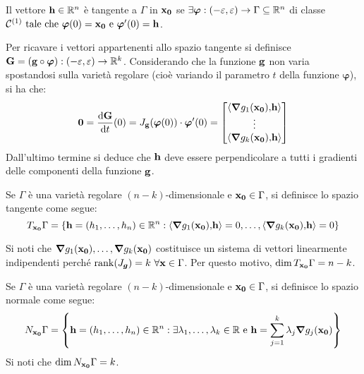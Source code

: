 \begin{definition}
    Il vettore $\vb{h} \in \mathbb{R}^n$ è tangente a $\Gamma$ in $\vb{x_0}$ se $\exists \bm\varphi: (-\varepsilon, \varepsilon) \to \Gamma \subseteq \mathbb{R}^n$ di classe $\mathcal{C}^{(1)} \text{ tale che } \bm\varphi (0) = \vb{x_0} \text{ e } \bm\varphi ' (0) = \vb{h}$.
\end{definition}

Per ricavare i vettori appartenenti allo spazio tangente si definisce $\vb{G}=(\vb{g}\circ\bm\varphi):(-\varepsilon,\varepsilon)\to\mathbb{R}^k$. Considerando che la funzione $\vb{g}$ non varia spostandosi sulla varietà regolare (cioè variando il parametro $t$ della funzione $\bm\varphi$), si ha che:
$$
    \vb{0}=\frac{\dd \vb{G}}{\dd t}(0)=J_{\vb{g}}(\bm\varphi(0))\cdot \bm\varphi'(0)=
    \begin{bmatrix}
        \left\langle\grad g_1(\vb{x_0}){,}\vb{h}\right\rangle\\
        \vdots\\
        \left\langle\grad g_k(\vb{x_0}){,}\vb{h}\right\rangle
    \end{bmatrix}
$$
Dall'ultimo termine si deduce che $\vb{h}$ deve essere perpendicolare a tutti i gradienti delle componenti della funzione $\vb{g}$.

\begin{definition}
    Se $\Gamma$ è una varietà regolare $(n-k)$-dimensionale e $\vb{x_0} \in \Gamma$, si definisce lo spazio tangente come segue:
    $$
        T_{\vb{x_0}}\Gamma = \{ \vb{h}=(h_1,\dots,h_n) \in \R^n : \ip{\grad g_1(\vb{x_0})}{\vb{h}}=0,\dots,\ip{\grad g_k(\vb{x_0})}{\vb{h}}=0 \}
    $$
\end{definition}

\begin{remark}
    Si noti che $\grad g_1(\vb{x_0}),\dots,\grad g_k (\vb{x_0})$ costituisce un sistema di vettori linearmente indipendenti perché $\rank(J_{\bm g})=k \ \forall \vb{x} \in \Gamma$. Per questo motivo, $\dim T_{\vb{x_0}}\Gamma= n-k$.
\end{remark}

\begin{definition}
    Se $\Gamma$ è una varietà regolare $(n-k)$-dimensionale e $\vb{x_0} \in \Gamma$, si definisce lo spazio normale come segue:
    $$
        N_{\vb{x_0}}\Gamma = \left\{ \vb{h}=(h_1,\dots,h_n) \in \mathbb{R}^n : \exists \lambda_1, \dots, \lambda_k \in \mathbb{R} \text{ e } \vb{h}=\sum_{j=1}^k \lambda_j \grad g_j(\vb{x_0}) \right\}
    $$
    Si noti che $\dim N_{\vb{x_0}}\Gamma = k$.
\end{definition}

